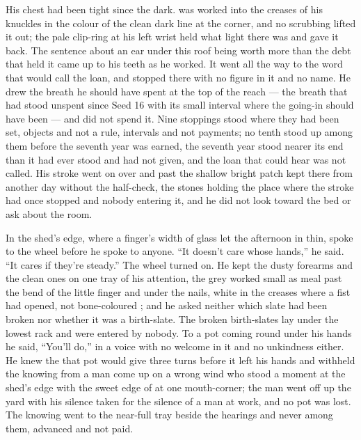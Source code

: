 His chest had been tight since the dark.  was worked into the creases of his knuckles in the colour of the clean dark line at the corner, and no scrubbing lifted it out; the pale clip-ring at his left wrist held what light there was and gave it back. The sentence about an ear under this roof being worth more than the debt that held it came up to his teeth as he worked. It went all the way to the word that would call the loan, and stopped there with no figure in it and no name. He drew the breath he should have spent at the top of the reach --- the breath that had stood unspent since Seed 16 with its small interval where the going-in should have been --- and did not spend it. Nine stoppings stood where they had been set, objects and not a rule, intervals and not payments; no tenth stood up among them before the seventh year was earned, the seventh year stood nearer its end than it had ever stood and had not given, and the loan that could hear was not called. His stroke went on over  and past the shallow bright patch kept there from another day without the half-check, the stones holding the place where the stroke had once stopped and nobody entering it, and he did not look toward the bed or ask about the room.

In the shed's edge, where a finger's width of glass let the afternoon in thin,  spoke to the wheel before he spoke to anyone. “It doesn't care whose hands,” he said. “It cares if they're steady.” The wheel turned on. He kept the dusty forearms and the clean ones on one tray of his attention, the grey worked small as meal past the bend of the little finger and under the nails, white in the creases where a fist had opened, not bone-coloured ; and he asked neither which slate had been broken nor whether it was a birth-slate. The broken birth-slates lay under the lowest rack and were entered by nobody. To a pot coming round under his hands he said, “You'll do,” in a voice with no welcome in it and no unkindness either. He knew the  that pot would give three turns before it left his hands and withheld the knowing from a man come up on a wrong wind who stood a moment at the shed's edge with the sweet edge of  at one mouth-corner; the man went off up the yard with his silence taken for the silence of a man at work, and no pot was lost. The knowing went to the near-full tray beside the hearings and never among them, advanced and not paid.

